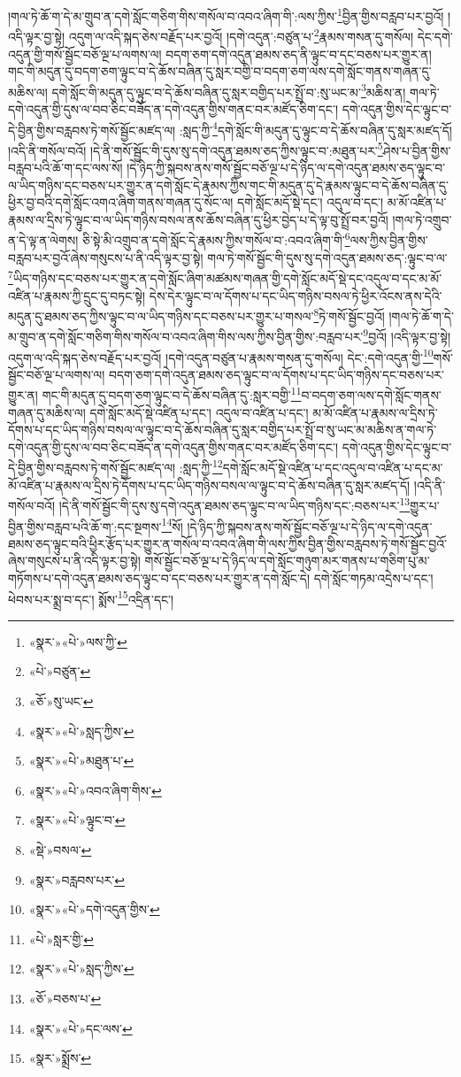 །གལ་ཏེ་ཆོ་ག་དེ་མ་གྲུབ་ན་དགེ་སློང་གཅིག་གིས་གསོལ་བ་འབའ་ཞིག་གི་:ལས་ཀྱིས་\footnote{«སྣར་»«པེ་»ལས་ཀྱི་}བྱིན་གྱིས་བརླབ་པར་བྱའོ། །འདི་ལྟར་བྱ་སྟེ། འདུག་ལ་འདི་སྐད་ཅེས་བརྗོད་པར་བྱའོ། །དགེ་འདུན་:བཙུན་པ་\footnote{«པེ་»བཙུན་}རྣམས་གསན་དུ་གསོལ། དེང་དགེ་འདུན་གྱི་གསོ་སྦྱོང་བཅོ་ལྔ་པ་ལགས་ལ། བདག་ཅག་དགེ་འདུན་ཐམས་ཅད་ནི་ལྟུང་བ་དང་བཅས་པར་གྱུར་ན། གང་གི་མདུན་དུ་བདག་ཅག་ལྟུང་བ་དེ་ཆོས་བཞིན་དུ་སླར་བགྱི་བ་བདག་ཅག་ལས་དགེ་སློང་གནས་གཞན་དུ་མཆིས་ལ། དགེ་སློང་གི་མདུན་དུ་ལྟུང་བ་དེ་ཆོས་བཞིན་དུ་སླར་བགྱིད་པར་སྤྲོ་བ་:སུ་ཡང་མ་\footnote{«ཅོ་»སུ་ཡང་}མཆིས་ན། གལ་ཏེ་དགེ་འདུན་གྱི་དུས་ལ་བབ་ཅིང་བཟོད་ན་དགེ་འདུན་གྱིས་གནང་བར་མཛོད་ཅིག་དང་། དགེ་འདུན་གྱིས་དེང་ལྟུང་བ་དེ་བྱིན་གྱིས་བརླབས་ཏེ་གསོ་སྦྱོང་མཛད་ལ། :སླད་ཀྱི་\footnote{«སྣར་»«པེ་»སླད་ཀྱིས་}དགེ་སློང་གི་མདུན་དུ་ལྟུང་བ་དེ་ཆོས་བཞིན་དུ་སླར་མཛད་དོ། །འདི་ནི་གསོལ་བའོ། །དེ་ནི་གསོ་སྦྱོང་གི་དུས་སུ་དགེ་འདུན་ཐམས་ཅད་ཀྱིས་ལྟུང་བ་:མཐུན་པར་\footnote{«སྣར་»«པེ་»མཐུན་པ་}ཤེས་པ་བྱིན་གྱིས་བརླབ་པའི་ཆོ་ག་དང་ལས་སོ། །དེ་ཉིད་ཀྱི་སྐབས་ནས་གསོ་སྦྱོང་བཅོ་ལྔ་པ་དེ་ཉིད་ལ་དགེ་འདུན་ཐམས་ཅད་ལྟུང་བ་ལ་ཡིད་གཉིས་དང་བཅས་པར་གྱུར་ན་དགེ་སློང་དེ་རྣམས་ཀྱིས་གང་གི་མདུན་དུ་དེ་རྣམས་ལྟུང་བ་དེ་ཆོས་བཞིན་དུ་ཕྱིར་བྱ་བའི་དགེ་སློང་འགའ་ཞིག་གནས་གཞན་དུ་སོང་ལ། དགེ་སློང་མདོ་སྡེ་དང་། འདུལ་བ་དང་། མ་མོ་འཛིན་པ་རྣམས་ལ་དྲིས་ཏེ་ལྟུང་བ་ལ་ཡིད་གཉིས་བསལ་ནས་ཆོས་བཞིན་དུ་ཕྱིར་བྱེད་པ་དེ་ལྟ་བུ་སྤྲོ་བར་བྱའོ། །གལ་ཏེ་འགྲུབ་ན་དེ་ལྟ་ན་ལེགས། ཅི་སྟེ་མི་འགྲུབ་ན་དགེ་སློང་དེ་རྣམས་ཀྱིས་གསོལ་བ་:འབའ་ཞིག་གི་\footnote{«སྣར་»«པེ་»འབའ་ཞིག་གིས་}ལས་ཀྱིས་བྱིན་གྱིས་བརླབ་པར་བྱའོ་ཞེས་གསུངས་པ་ནི་འདི་ལྟར་བྱ་སྟེ། གལ་ཏེ་གསོ་སྦྱོང་གི་དུས་སུ་དགེ་འདུན་ཐམས་ཅད་:ལྟུང་བ་ལ་\footnote{«སྣར་»«པེ་»ལྟུང་བ་}ཡིད་གཉིས་དང་བཅས་པར་གྱུར་ན་དགེ་སློང་ཞིག་མཚམས་གཞན་གྱི་དགེ་སློང་མདོ་སྡེ་དང་འདུལ་བ་དང་མ་མོ་འཛིན་པ་རྣམས་ཀྱི་དྲུང་དུ་བཏང་སྟེ། དེས་དེར་ལྟུང་བ་ལ་དོགས་པ་དང་ཡིད་གཉིས་བསལ་ཏེ་ཕྱིར་འོངས་ནས་དེའི་མདུན་དུ་ཐམས་ཅད་ཀྱིས་ལྟུང་བ་ལ་ཡིད་གཉིས་དང་བཅས་པར་གྱུར་པ་གསལ་\footnote{«སྡེ་»བསལ་}ཏེ་གསོ་སྦྱོང་བྱའོ། །གལ་ཏེ་ཆོ་ག་དེ་མ་གྲུབ་ན་དགེ་སློང་གཅིག་གིས་གསོལ་བ་འབའ་ཞིག་གིས་ལས་ཀྱིས་བྱིན་གྱིས་:བརླབ་པར་\footnote{«སྣར་»བརླབས་པར་}བྱའོ། །འདི་ལྟར་བྱ་སྟེ། འདུག་ལ་འདི་སྐད་ཅེས་བརྗོད་པར་བྱའོ། །དགེ་འདུན་བཙུན་པ་རྣམས་གསན་དུ་གསོལ། དེང་:དགེ་འདུན་གྱི་\footnote{«སྣར་»«པེ་»དགེ་འདུན་གྱིས་}གསོ་སྦྱོང་བཅོ་ལྔ་པ་ལགས་ལ། བདག་ཅག་དགེ་འདུན་ཐམས་ཅད་ལྟུང་བ་ལ་དོགས་པ་དང་ཡིད་གཉིས་དང་བཅས་པར་གྱུར་ན། གང་གི་མདུན་དུ་བདག་ཅག་ལྟུང་བ་དེ་ཆོས་བཞིན་དུ་:སླར་བགྱི་\footnote{«པེ་»སླར་གྱི་}བ་བདག་ཅག་ལས་དགེ་སློང་གནས་གཞན་དུ་མཆིས་ལ། དགེ་སློང་མདོ་སྡེ་འཛིན་པ་དང་། འདུལ་བ་འཛིན་པ་དང་། མ་མོ་འཛིན་པ་རྣམས་ལ་དྲིས་ཏེ་དོགས་པ་དང་ཡིད་གཉིས་བསལ་ལ་ལྟུང་བ་དེ་ཆོས་བཞིན་དུ་སླར་བགྱིད་པར་སྤྲོ་བ་སུ་ཡང་མ་མཆིས་ན་གལ་ཏེ་དགེ་འདུན་གྱི་དུས་ལ་བབ་ཅིང་བཟོད་ན་དགེ་འདུན་གྱིས་གནང་བར་མཛོད་ཅིག་དང་། དགེ་འདུན་གྱིས་དེང་ལྟུང་བ་དེ་བྱིན་གྱིས་བརླབས་ཏེ་གསོ་སྦྱོང་མཛད་ལ། :སླད་ཀྱི་\footnote{«སྣར་»«པེ་»སླད་ཀྱིས་}དགེ་སློང་མདོ་སྡེ་འཛིན་པ་དང་འདུལ་བ་འཛིན་པ་དང་མ་མོ་འཛིན་པ་རྣམས་ལ་དྲིས་ཏེ་དོགས་པ་དང་ཡིད་གཉིས་བསལ་ལ་ལྟུང་བ་དེ་ཆོས་བཞིན་དུ་སླར་མཛད་དོ། །འདི་ནི་གསོལ་བའོ། །དེ་ནི་གསོ་སྦྱོང་གི་དུས་སུ་དགེ་འདུན་ཐམས་ཅད་ལྟུང་བ་ལ་ཡིད་གཉིས་དང་:བཅས་པར་\footnote{«ཅོ་»བཅས་པ་}གྱུར་པ་བྱིན་གྱིས་བརླབ་པའི་ཆོ་ག་:དང་སྔགས་\footnote{«སྣར་»«པེ་»དང་ལས་}སོ། །དེ་ཉིད་ཀྱི་སྐབས་ནས་གསོ་སྦྱོང་བཅོ་ལྔ་པ་དེ་ཉིད་ལ་དགེ་འདུན་ཐམས་ཅད་ལྟུང་བའི་ཕྱིར་རྩོད་པར་གྱུར་ན་གསོལ་བ་འབའ་ཞིག་གི་ལས་ཀྱིས་བྱིན་གྱིས་བརླབས་ཏེ་གསོ་སྦྱོང་བྱའོ་ཞེས་གསུངས་པ་ནི་འདི་ལྟར་བྱ་སྟེ། གསོ་སྦྱོང་བཅོ་ལྔ་པ་དེ་ཉིད་ལ་དགེ་སློང་གཉུག་མར་གནས་པ་གཅིག་པུ་མ་གཏོགས་པ་དགེ་འདུན་ཐམས་ཅད་ལྟུང་བ་དང་བཅས་པར་གྱུར་ན་དགེ་སློང་དེ། དགེ་སློང་གཏམ་འདྲེས་པ་དང་། ཕེབས་པར་སྨྲ་བ་དང་། སྨོས་\footnote{«སྣར་»སྨྲོས་}འདྲིན་དང་། 